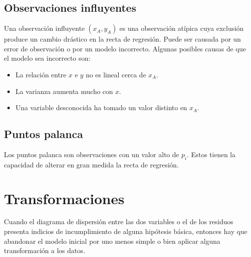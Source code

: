 \subsection*{Observaciones influyentes}
Una observación influyente $(x_A, y_A)$ es una observación atípica cuya exclusión produce un cambio drástico en la recta de regresión.
Puede ser causada por un error de observación o por un modelo incorrecto.
Algunas posibles causas de que el modelo sea incorrecto son:
\begin{itemize}
    \item La relación entre $x$ e $y$ no es lineal cerca de $x_A$.
    \item La varianza aumenta mucho con $x$.
    \item Una variable desconocida ha tomado un valor distinto en $x_A$.
\end{itemize}

\subsection*{Puntos palanca}
Los puntos palanca son observaciones con un valor alto de $p_i$.
Estos tienen la capacidad de alterar en gran medida la recta de regresión.

\section{Transformaciones}
Cuando el diagrama de dispersión entre las dos variables o el de los residuos presenta indicios de incumplimiento de alguna hipótesis básica, entonces hay que abandonar el modelo inicial por uno menos simple o bien aplicar alguna transformación a los datos.